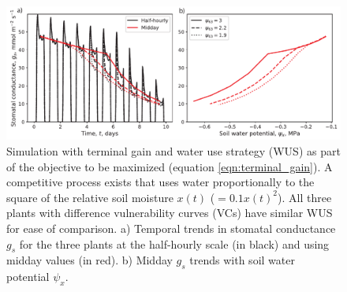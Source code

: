 \documentclass[utf8]{frontiersSCNS} %
\begin{document}

\begin{figure}[h]
    \centering
    \includegraphics[scale=0.75]{gs_resistant_vulnerable_competition_WUS.pdf}
    \caption{Simulation with terminal gain and water use strategy (WUS) as part of the objective to be maximized (equation \ref{eqn:terminal_gain}). A competitive process exists that uses water proportionally to the square of the relative soil moisture $x(t)$ ($= 0.1 x(t)^2$). All three plants with difference vulnerability curves (VCs) have similar WUS for ease of comparison. a) Temporal trends in stomatal conductance $g_s$ for the three plants at the half-hourly scale (in black) and using midday values (in red). b) Midday $g_s$ trends with soil water potential $\psi_x$.}
    \label{fig:resistant_vulnerable_gs_competition_WUS}
\end{figure}
\end{document}
